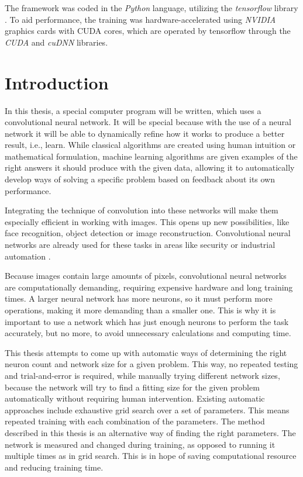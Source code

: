 \documentclass[12pt]{report}
\begin{document}
The framework was coded in the \textit{Python} language, utilizing the \textit{tensorflow} library \cite{tensorflow2015-whitepaper}. To aid performance, the training was hardware-accelerated using \textit{NVIDIA} graphics cards with CUDA cores, which are operated by tensorflow through the \textit{CUDA} and \textit{cuDNN} libraries.

\chapter*{Introduction}

In this thesis, a special computer program will be written, which uses a convolutional neural network. It will be special because with the use of a neural network it will be able to dynamically refine how it works to produce a better result, i.e., learn. While classical algorithms are created using human intuition or mathematical formulation, machine learning algorithms are given examples of the right answers it should produce with the given data, allowing it to automatically develop ways of solving a specific problem based on feedback about its own performance.

Integrating the technique of convolution into these networks will make them especially efficient in working with images. This opens up new possibilities, like face recognition, object detection or image reconstruction. Convolutional neural networks are already used for these tasks in areas like security or industrial automation \cite{applications}.

Because images contain large amounts of pixels, convolutional neural networks are computationally demanding, requiring expensive hardware and long training times. A larger neural network has more neurons, so it must perform more operations, making it more demanding than a smaller one. This is why it is important to use a network which has just enough neurons to perform the task accurately, but no more, to avoid unnecessary calculations and computing time.

This thesis attempts to come up with automatic ways of determining the right neuron count and network size for a given problem. This way, no repeated testing and trial-and-error is required, while manually trying different network sizes, because the network will try to find a fitting size for the given problem automatically without requiring human intervention. Existing automatic approaches include exhaustive grid search over a set of parameters. This means repeated training with each combination of the parameters. The method described in this thesis is an alternative way of finding the right parameters. The network is measured and changed during training, as opposed to running it multiple times as in grid search. This is in hope of saving computational resource and reducing training time.
\end{document}
